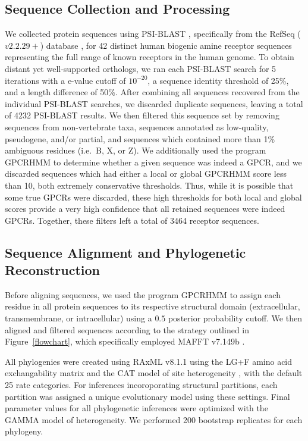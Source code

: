 \documentclass[fleqn,10pt]{wlpeerj}
\begin{document}
\subsection*{Sequence Collection and Processing}
We collected protein sequences using PSI-BLAST \citep{psiblast}, specifically from the RefSeq ($v2.2.29+$) database \citep{refseq}, for 42 distinct human biogenic amine receptor sequences representing the full range of known receptors in the human genome. To obtain distant yet well-supported orthologs, we ran each PSI-BLAST search for 5 iterations with a e-value cutoff of $10^{-20}$, a sequence identity threshold of 25\%, and a length difference of 50\%. After combining all sequences recovered from the individual PSI-BLAST searches, we discarded duplicate sequences, leaving a total of 4232 PSI-BLAST results. We then filtered this sequence set by removing sequences from non-vertebrate taxa, sequences annotated as low-quality, pseudogene, and/or partial, and sequences which contained more than 1\% ambiguous residues (i.e.\ B, X, or Z). We additionally used the program GPCRHMM \citep{Wistrand2006} to determine whether a given sequence was indeed a GPCR, and we discarded sequences which had either a local or global GPCRHMM score less than 10, both extremely conservative thresholds. Thus, while it is possible that some true GPCRs were discarded, these high thresholds for both local and global scores provide a very high confidence that all retained sequences were indeed GPCRs. Together, these filters left a total of 3464 receptor sequences.


\subsection*{Sequence Alignment and Phylogenetic Reconstruction}
Before aligning sequences, we used the program GPCRHMM \citep{Wistrand2006} to assign each residue in all protein sequences to its respective structural domain (extracellular, transmembrane, or intracellular) using a $0.5$ posterior probability cutoff. We then aligned and filtered sequences according to the strategy outlined in Figure~\ref{flowchart}, which specifically employed MAFFT v7.149b \citep{mafftv7}. 

All phylogenies were created using RAxML v8.1.1 \citep{raxml} using the LG+F \citep{LG} amino acid exchangability matrix and the CAT model of site heterogeneity \citep{Stamatakis2006}, with the default 25 rate categories. For inferences incoroporating structural partitions, each partition was assigned a unique evolutionary model using these settings. Final parameter values for all phylogenetic inferences were optimized with the GAMMA model of heterogeneity. We performed 200 bootstrap replicates for each phylogeny.
\end{document}
